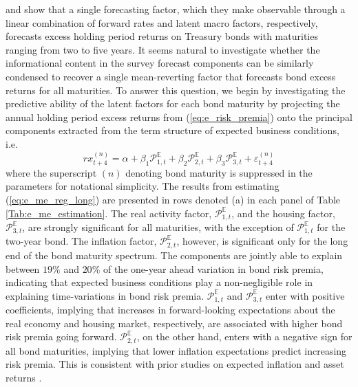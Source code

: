 \documentclass[12pt,letterpaper,leqno,doublespacing]{article}
\begin{document}
\cite{CochranePiazzesi2005} and \cite{LudvigsonNg2009} show that a single forecasting factor, which they make observable through a linear combination of forward rates and latent macro factors, respectively, forecasts excess holding period returns on Treasury bonds with maturities ranging from two to five years. It seems natural to investigate whether the informational content in the survey forecast components can be similarly condensed to recover a single mean-reverting factor that forecasts bond excess returns for all maturities. To answer this question, we begin by investigating the predictive ability of the latent factors for each bond maturity by projecting the annual holding period excess returns from (\ref{eq:e_risk_premia}) onto the principal components extracted from the term structure of expected business conditions, i.e. 
\begin{equation}
    rx_{t+4}^{\left(n\right)} = \alpha + \beta_{1}\mathcal{P}_{1,t}^{\mathbb{E}} + \beta_{2}\mathcal{P}_{2,t}^{\mathbb{E}} + \beta_{3}\mathcal{P}_{3,t}^{\mathbb{E}} + \varepsilon_{t+4}^{\left(n\right)}
    \label{eq:e_me_reg_long}
\end{equation}
where the superscript $\left(n\right)$ denoting bond maturity is suppressed in the parameters for notational simplicity. The results from estimating (\ref{eq:e_me_reg_long}) are presented in rows denoted (a) in each panel of Table \ref{Tab:e_me_estimation}. The real activity factor, $\mathcal{P}_{1,t}^{\mathbb{E}}$, and the housing factor, $\mathcal{P}_{3,t}^{\mathbb{E}}$, are strongly significant for all maturities, with the exception of $\mathcal{P}_{1,t}^{\mathbb{E}}$ for the two-year bond. The inflation factor, $\mathcal{P}_{2,t}^{\mathbb{E}}$, however, is significant only for the long end of the bond maturity spectrum. The components are jointly able to explain between $19\%$ and $20\%$ of the one-year ahead variation in bond risk premia, indicating that expected business conditions play a non-negligible role in explaining time-variations in bond risk premia. $\mathcal{P}_{1,t}^{\mathbb{E}}$ and $\mathcal{P}_{3,t}^{\mathbb{E}}$ enter with positive coefficients, implying that increases in forward-looking expectations about the real economy and housing market, respectively, are associated with higher bond risk premia going forward. $\mathcal{P}_{2,t}^{\mathbb{E}}$, on the other hand, enters with a negative sign for all bond maturities, implying that lower inflation expectations predict increasing risk premia. This is consistent with prior studies on expected inflation and asset returns \citep{FamaSchwert1977,CampbellAmmer1993,CieslakPovala2015}.
\end{document}
